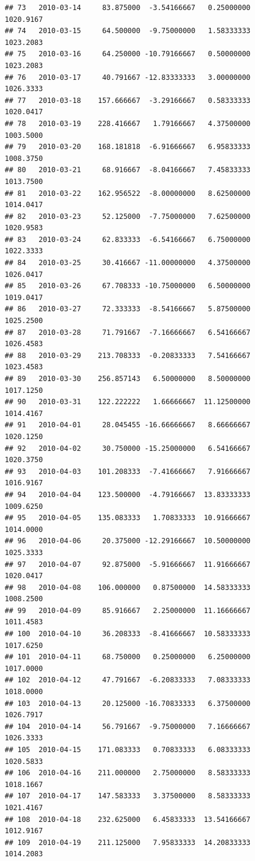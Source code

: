 \documentclass[
]{article}
\begin{document}
\begin{verbatim}
## 73   2010-03-14     83.875000  -3.54166667   0.25000000    1020.9167
## 74   2010-03-15     64.500000  -9.75000000   1.58333333    1023.2083
## 75   2010-03-16     64.250000 -10.79166667   0.50000000    1023.2083
## 76   2010-03-17     40.791667 -12.83333333   3.00000000    1026.3333
## 77   2010-03-18    157.666667  -3.29166667   0.58333333    1020.0417
## 78   2010-03-19    228.416667   1.79166667   4.37500000    1003.5000
## 79   2010-03-20    168.181818  -6.91666667   6.95833333    1008.3750
## 80   2010-03-21     68.916667  -8.04166667   7.45833333    1013.7500
## 81   2010-03-22    162.956522  -8.00000000   8.62500000    1014.0417
## 82   2010-03-23     52.125000  -7.75000000   7.62500000    1020.9583
## 83   2010-03-24     62.833333  -6.54166667   6.75000000    1022.3333
## 84   2010-03-25     30.416667 -11.00000000   4.37500000    1026.0417
## 85   2010-03-26     67.708333 -10.75000000   6.50000000    1019.0417
## 86   2010-03-27     72.333333  -8.54166667   5.87500000    1025.2500
## 87   2010-03-28     71.791667  -7.16666667   6.54166667    1026.4583
## 88   2010-03-29    213.708333  -0.20833333   7.54166667    1023.4583
## 89   2010-03-30    256.857143   6.50000000   8.50000000    1017.1250
## 90   2010-03-31    122.222222   1.66666667  11.12500000    1014.4167
## 91   2010-04-01     28.045455 -16.66666667   8.66666667    1020.1250
## 92   2010-04-02     30.750000 -15.25000000   6.54166667    1020.3750
## 93   2010-04-03    101.208333  -7.41666667   7.91666667    1016.9167
## 94   2010-04-04    123.500000  -4.79166667  13.83333333    1009.6250
## 95   2010-04-05    135.083333   1.70833333  10.91666667    1014.0000
## 96   2010-04-06     20.375000 -12.29166667  10.50000000    1025.3333
## 97   2010-04-07     92.875000  -5.91666667  11.91666667    1020.0417
## 98   2010-04-08    106.000000   0.87500000  14.58333333    1008.2500
## 99   2010-04-09     85.916667   2.25000000  11.16666667    1011.4583
## 100  2010-04-10     36.208333  -8.41666667  10.58333333    1017.6250
## 101  2010-04-11     68.750000   0.25000000   6.25000000    1017.0000
## 102  2010-04-12     47.791667  -6.20833333   7.08333333    1018.0000
## 103  2010-04-13     20.125000 -16.70833333   6.37500000    1026.7917
## 104  2010-04-14     56.791667  -9.75000000   7.16666667    1026.3333
## 105  2010-04-15    171.083333   0.70833333   6.08333333    1020.5833
## 106  2010-04-16    211.000000   2.75000000   8.58333333    1018.1667
## 107  2010-04-17    147.583333   3.37500000   8.58333333    1021.4167
## 108  2010-04-18    232.625000   6.45833333  13.54166667    1012.9167
## 109  2010-04-19    211.125000   7.95833333  14.20833333    1014.2083

\end{verbatim}
\end{document}
